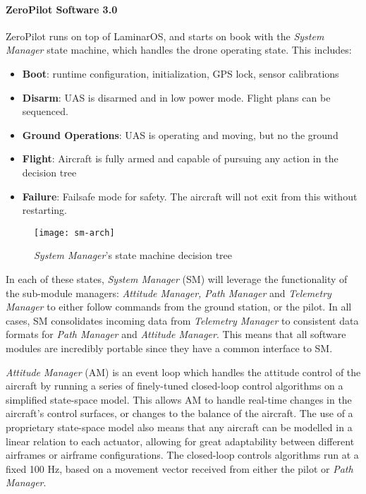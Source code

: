 \paragraph{ZeroPilot Software 3.0}

ZeroPilot runs on top of LaminarOS, and starts on book with the \textit{System
Manager} state machine, which handles the drone operating state. This includes:

\begin{itemize}
    \item \textbf{Boot}: runtime configuration, initialization, GPS lock, sensor 
    calibrations

	\item \textbf{Disarm}: UAS is disarmed and in low power mode. Flight plans
		can be sequenced.

	\item \textbf{Ground Operations}: UAS is operating and moving, but no the
		ground

	\item \textbf{Flight}: Aircraft is fully armed and capable of pursuing any
		action in the decision tree

	\item \textbf{Failure}: Failsafe mode for safety. The aircraft will not
		exit from this without restarting.
\end{itemize}


\begin{figure}[H]
        \centering
        \texttt{[image: sm-arch]}
        \caption{\textit{System Manager}'s state machine decision tree}
\end{figure}

In each of these states, \textit{System Manager} (SM) will leverage the
functionality of the sub-module managers: \textit{Attitude Manager, Path
Manager} and \textit{Telemetry Manager} to either follow commands from the
ground station, or the pilot. In all cases, SM consolidates incoming data from
\textit{Telemetry Manager} to consistent data formats for \textit{Path Manager}
and \textit{Attitude Manager}. This means that all software modules are
incredibly portable since they have a common interface to SM.

\textit{Attitude Manager} (AM) is an event loop which handles the attitude
control of the aircraft by running a series of finely-tuned closed-loop control
algorithms on a simplified state-space model. This allows AM to handle
real-time changes in the aircraft's control surfaces, or changes to the balance
of the aircraft. The use of a proprietary state-space model also means that any
aircraft can be modelled in a linear relation to each actuator, allowing for
great adaptability between different airframes or airframe configurations. The
closed-loop controls algorithms run at a fixed 100 Hz, based on a movement
vector received from either the pilot or \textit{Path Manager}.

